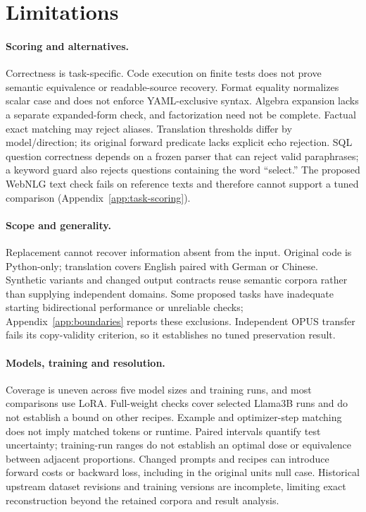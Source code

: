 \documentclass[11pt]{article}
\begin{document}
\section*{Limitations}
\label{sec:limitations}
\paragraph{Scoring and alternatives.}
Correctness is task-specific. Code execution on finite tests does not prove semantic
equivalence or readable-source recovery. Format equality normalizes scalar case and does
not enforce YAML-exclusive syntax. Algebra expansion lacks a separate expanded-form check,
and factorization need not be complete. Factual exact matching may reject aliases.
Translation thresholds differ by model/direction; its original forward predicate lacks
explicit echo rejection. SQL question correctness depends on a frozen parser that can
reject valid paraphrases; a keyword guard also rejects questions containing the word
``select.'' The proposed WebNLG text check fails on reference texts and
therefore cannot support a tuned comparison (Appendix~\ref{app:task-scoring}).

\paragraph{Scope and generality.}
Replacement cannot recover information absent from the input. Original code is Python-only;
translation covers English paired with German or Chinese. Synthetic variants and changed
output contracts reuse semantic corpora rather than supplying independent domains.
Some proposed tasks have inadequate starting bidirectional performance or unreliable
checks; Appendix~\ref{app:boundaries} reports these exclusions. Independent OPUS transfer
fails its copy-validity criterion, so it establishes no tuned preservation result.

\paragraph{Models, training and resolution.}
Coverage is uneven across five model sizes and training runs, and most comparisons use
LoRA. Full-weight checks cover selected Llama3B runs and do not establish a bound on other
recipes. Example and optimizer-step matching does not imply matched tokens or runtime.
Paired intervals quantify test uncertainty; training-run ranges do not establish an
optimal dose or equivalence between adjacent proportions. Changed prompts and recipes
can introduce forward costs or backward loss, including in the original units null case.
Historical upstream dataset revisions and training versions are incomplete, limiting exact
reconstruction beyond the retained corpora and result analysis.
\end{document}
